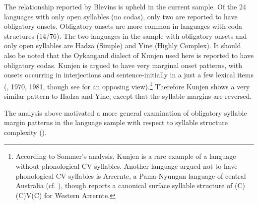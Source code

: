   The relationship reported by Blevins is upheld in the current sample. Of the 24 languages with only open syllables (no codas), only two are reported to have obligatory onsets. Obligatory onsets are more common in languages with coda structures (14/76). The two languages in the sample with obligatory onsets and only open syllables are Hadza (Simple) and Yine (Highly Complex). It should also be noted that the Oykangand dialect of Kunjen used here is reported to have obligatory codas. Kunjen is argued to have very marginal onset patterns, with onsets occurring in interjections and sentence-initially in a just a few lexical items (\citealt{Sommer1969}, 1970, 1981, though see \citealt{Dixon1970} for an opposing view).\footnote{{According to Sommer’s analysis, Kunjen is a rare example of a language without phonological CV syllables. Another language argued not to have phonological CV syllables is Arrernte, a Pama-Nyungan language of central Australia (cf. \citealt{BreenPensalfini1999}), though \citet{Anderson2000} reports a canonical surface syllable structure of (C)(C)V(C) for Western Arrernte.}} Therefore Kunjen shows a very similar pattern to Hadza and Yine, except that the syllable margins are reversed.

  The analysis above motivated a more general examination of obligatory syllable margin patterns in the language sample with respect to syllable structure complexity ().

